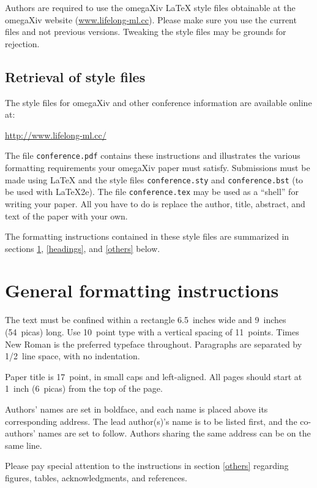 \documentclass{article} %
\begin{document}
Authors are required to use the omegaXiv \LaTeX{} style files obtainable at the
omegaXiv website (\href{www.lifelong-ml.cc}{www.lifelong-ml.cc}). Please make sure you use the current files and
not previous versions. Tweaking the style files may be grounds for rejection.

\subsection{Retrieval of style files}

The style files for omegaXiv and other conference information are available online at:
\begin{center}
   \href{http://www.lifelong-ml.cc/}{http://www.lifelong-ml.cc/}
\end{center}
The file \verb+conference.pdf+ contains these
instructions and illustrates the
various formatting requirements your omegaXiv paper must satisfy.
Submissions must be made using \LaTeX{} and the style files
\verb+conference.sty+ and \verb+conference.bst+ (to be used with \LaTeX{}2e). The file
\verb+conference.tex+ may be used as a ``shell'' for writing your paper. All you
have to do is replace the author, title, abstract, and text of the paper with
your own.

The formatting instructions contained in these style files are summarized in
sections \ref{gen_inst}, \ref{headings}, and \ref{others} below.

\section{General formatting instructions}
\label{gen_inst}

The text must be confined within a rectangle 6.5~inches wide and
9~inches (54~picas) long.
Use 10~point type with a vertical spacing of 11~points. Times New Roman is the
preferred typeface throughout. Paragraphs are separated by 1/2~line space,
with no indentation.

Paper title is 17~point, in small caps and left-aligned.
All pages should start at 1~inch (6~picas) from the top of the page.

Authors' names are
set in boldface, and each name is placed above its corresponding
address. The lead author(s)'s name is to be listed first, and
the co-authors' names are set to follow. Authors sharing the
same address can be on the same line.

Please pay special attention to the instructions in section \ref{others}
regarding figures, tables, acknowledgments, and references.
\end{document}
